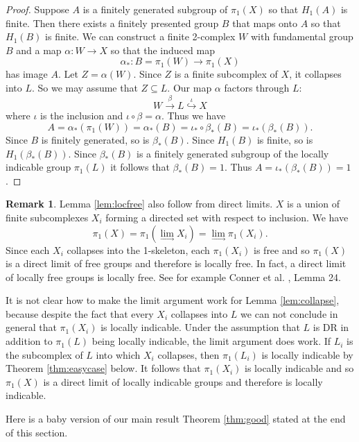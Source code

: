 \documentclass[12pt]{amsart}
\theoremstyle{definition}
\newtheorem{remark}{Remark}
\begin{document}
\begin{proof}
Suppose $A$ is a finitely generated subgroup of $\pi_1(X)$ so that $H_1(A)$ is finite. Then there exists a finitely presented group $B$ that maps onto $A$ so that $H_1(B)$ is finite.
We can construct a finite 2-complex $W$ with fundamental group $B$ and a map $\alpha\colon W\to X$ so that the induced map 
$$\alpha_*\colon B=\pi_1(W)\to \pi_1(X)$$ has image $A$.
Let $Z=\alpha(W)$. Since $Z$ is a finite subcomplex of $X$, it collapses into $L$. 
So we may assume that $Z\subseteq L$. Our map $\alpha$ factors through $L$:
$$W\stackrel{\beta}{\to} L\stackrel{\iota}\hookrightarrow X$$
where $\iota$ is the inclusion and $\iota\circ \beta=\alpha$. Thus we have 
$$A=\alpha_*(\pi_1(W))=\alpha_*(B)=\iota_*\circ \beta_*(B)=\iota_*(\beta_*(B)).$$
Since $B$ is finitely generated, so is $\beta_*(B)$. Since $H_1(B)$ is finite, so is $H_1(\beta_*(B))$. 
Since $\beta_*(B)$ is a finitely generated subgroup of the locally indicable group $\pi_1(L)$ it follows that $\beta_*(B)=1$. Thus $A=\iota_*(\beta_*(B))=1$.
\end{proof}

\begin{remark}\label{remark:limits}
Lemma \ref{lem:locfree} also follow from direct limits. $X$ is a union of finite subcomplexes $X_i$ forming a directed set with respect to inclusion. We have
$$\pi_1(X)=\pi_1(\lim_{\to}X_i)=\lim_{\to}\pi_1(X_i).$$
Since each $X_i$ collapses into the 1-skeleton, each $\pi_1(X_i)$ is free and so $\pi_1(X)$ is a direct limit of free groups and therefore is locally free. In fact, a direct limit of locally free groups is locally free. See for example Conner et al. \cite{Conner}, Lemma 24.

It is not clear how to make the limit argument work for Lemma \ref{lem:collapse}, because despite the fact that every $X_i$ collapses into $L$ we can not conclude in general that $\pi_1(X_i)$ is locally indicable. Under the assumption that $L$ is DR in addition to $\pi_1(L)$ being locally indicable, the limit argument does work. If $L_i$ is the subcomplex of $L$ into which $X_i$ collapses, then $\pi_1(L_i)$ is locally indicable by Theorem \ref{thm:easycase} below. It follows that $\pi_1(X_i)$ is locally indicable and so $\pi_1(X)$ is a direct limit of locally indicable groups and therefore is locally indicable.
 \end{remark}



Here is a baby version of our main result Theorem \ref{thm:good} stated at the end of this section.
\end{document}
